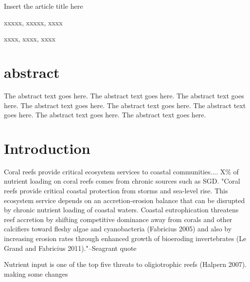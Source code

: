 \documentclass{article}%
\begin{document}
Insert the article title here




xxxxx, xxxxx, xxxx

xxxx, xxxx, xxxx


\linenumbers %
\section{abstract}
The abstract text goes here. The abstract text goes here. The abstract text goes here. The abstract text goes here.
The abstract text goes here. The abstract text goes here. The abstract text goes here. The abstract text goes here.




\section{Introduction  }

Coral reefs provide critical ecosystem services to coastal communities.... 
X\% of nutrient loading on coral reefs comes from chronic sources such as SGD.  
"Coral reefs provide critical coastal protection from storms and sea-level rise. This ecosystem service
depends on an accretion-erosion balance that can be disrupted by chronic nutrient loading of coastal waters.
Coastal eutrophication threatens reef accretion by shifting competitive dominance away from corals and other
calcifiers toward fleshy algae and cyanobacteria (Fabricius 2005) and also by increasing erosion rates through
enhanced growth of bioeroding invertebrates (Le Grand and Fabricius 2011)."--Seagrant quote

Nutrient input is one of the top five threats to oligiotrophic reefs (Halpern 2007).   making some changes
\end{document}
